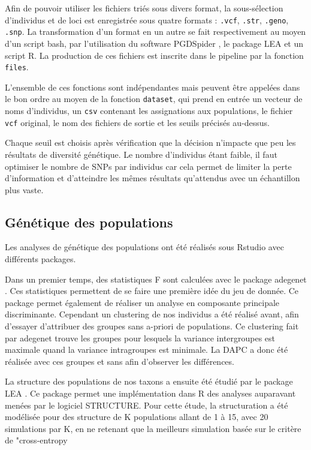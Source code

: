 Afin de pouvoir utiliser les fichiers triés sous divers format, la sous-sélection d'individus et de loci est enregistrée sous quatre formats : \verb|.vcf|, \verb|.str|, \verb|.geno|, \verb|.snp|. 
La transformation d'un format en un autre se fait respectivement au moyen d'un script bash, par l'utilisation du software PGDSpider \citep{Lischer2012}, le package LEA \citep{Frichot2015} et un script R. 
La production de ces fichiers est inscrite dans le pipeline par la fonction \verb|files|.

L'ensemble de ces fonctions sont indépendantes mais peuvent être appelées dans le bon ordre au moyen de la fonction \verb|dataset|, qui prend en entrée un vecteur de noms d'individus, un \verb|csv| contenant les assignations aux populations, le fichier \verb|vcf| original, le nom des fichiers de sortie et les seuils précisés au-dessus.


Chaque seuil est choisis après vérification que la décision n'impacte que peu les résultats de diversité génétique.
Le nombre d'individus étant faible, il faut optimiser le nombre de SNPs par individus car cela permet de limiter la perte d'information et d'atteindre les mêmes résultats qu'attendus avec un échantillon plus vaste. \citep{Nazareno2017}


\subsection{Génétique des populations}

Les analyses de génétique des populations ont été réalisés sous Rstudio \citep{RTeam2017} avec différents packages. 

Dans un premier temps, des statistiques F sont calculées avec le package adegenet \citep{Jombart2011}. Ces statistiques permettent de se faire une première idée du jeu de donnée.
Ce package permet également de réaliser un analyse en composante principale discriminante.
Cependant un clustering de nos individus a été réalisé avant, afin d'essayer d'attribuer des groupes sans a-priori de populations.
Ce clustering fait par adegenet trouve les groupes pour lesquels la variance intergroupes est maximale quand la variance intragroupes est minimale.
La DAPC a donc été réalisée avec ces groupes et sans afin d'observer les différences.

La structure des populations de nos taxons a ensuite été étudié par le package LEA \citep{Frichot2015}.
Ce package permet une implémentation dans R des analyses auparavant menées par le logiciel STRUCTURE.
Pour cette étude, la structuration a été modélisée pour des structure de K populations allant de 1 à 15, avec 20 simulations par K, en ne retenant que la meilleurs simulation basée sur le critère de "cross-entropy

